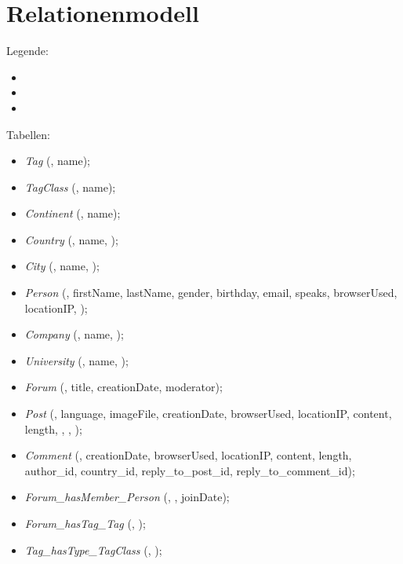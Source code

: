 





\section*{Relationenmodell}
Legende:
\begin{itemize}
  \item {}
  \item {}
  \item {}
\end{itemize}

Tabellen:
\begin{itemize}
  \item \emph{Tag} (, name);
  \item \emph{TagClass} (, name);
  \item \emph{Continent} (, name);
  \item \emph{Country} (, name, );
  \item \emph{City} (, name, );
  \item \emph{Person} (, firstName, lastName, gender, birthday, email, speaks, browserUsed, locationIP, );
  \item \emph{Company} (, name, );
  \item \emph{University} (, name, );
  \item \emph{Forum} (, title, creationDate, moderator);
  \item \emph{Post} (, language, imageFile, creationDate, browserUsed, locationIP, content, length, , , );
  \item \emph{Comment} (, creationDate, browserUsed, locationIP, content, length, author\_id, country\_id, reply\_to\_post\_id, reply\_to\_comment\_id);
  \item \emph{Forum\_hasMember\_Person} (, , joinDate);
  \item \emph{Forum\_hasTag\_Tag} (, );
  \item \emph{Tag\_hasType\_TagClass} (, );

\end{itemize}
